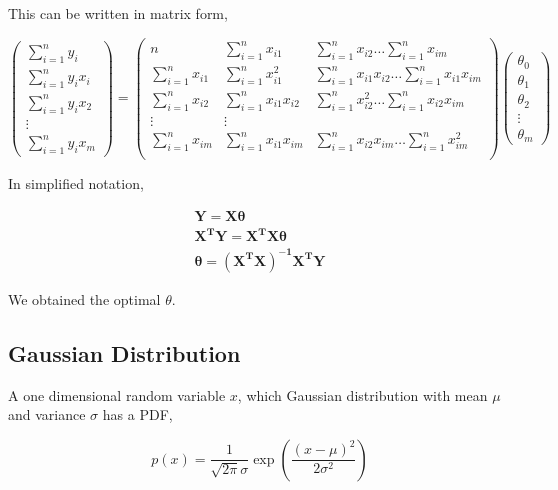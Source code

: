 \documentclass[english]{tktltiki}
\begin{document}
This can be written in matrix form,

$$
\begin{pmatrix}
\sum_{i=1}^n y_i \\
\sum_{i=1}^n y_i x_i \\
\sum_{i=1}^n y_i x_2 \\
\vdots \\
\sum_{i=1}^n y_i x_m
\end{pmatrix}
=%
\begin{pmatrix}
n & \sum_{i=1}^n x_{i1} & \sum_{i=1}^n x_{i2} \hdots \sum_{i=1}^n x_{im} \\
\sum_{i=1}^n x_{i1} & \sum_{i=1}^n x_{i1}^2 & \sum_{i=1}^n x_{i1} x_{i2} \hdots \sum_{i=1}^n x_{i1} x_{im} \\
\sum_{i=1}^n x_{i2} & \sum_{i=1}^n x_{i1} x_{i2} & \sum_{i=1}^n x_{i2}^2 \hdots \sum_{i=1}^n x_{i2} x_{im} \\
\vdots&\vdots \\
\sum_{i=1}^n x_{im} & \sum_{i=1}^n x_{i1} x_{im} & \sum_{i=1}^n x_{i2} x_{im} \hdots \sum_{i=1}^n x_{im}^2 \\
\end{pmatrix}
%
\begin{pmatrix}
\theta_0 \\
\theta_1 \\
\theta_2 \\
\vdots \\
\theta_m
\end{pmatrix}
$$

In simplified notation,

\begin{eqnarray}
\mathbf{Y} = \mathbf{X \theta} \nonumber \\
\mathbf{X^TY} = \mathbf{X^T X \theta} \nonumber \\
\mathbf{\theta} = \mathbf{(X^T X)^{-1} X^T Y}
\end{eqnarray}

We obtained the optimal $\theta$.

\subsection{Gaussian Distribution}

A one dimensional random variable $x$, which Gaussian distribution with mean $\mu$ and variance $\sigma$ has a PDF,

\begin{equation}
p(x) = \frac{1}{\sqrt{2 \pi}\sigma} \exp(\frac{(x - \mu)^2}{2 \sigma^2})
\end{equation}
\end{document}
